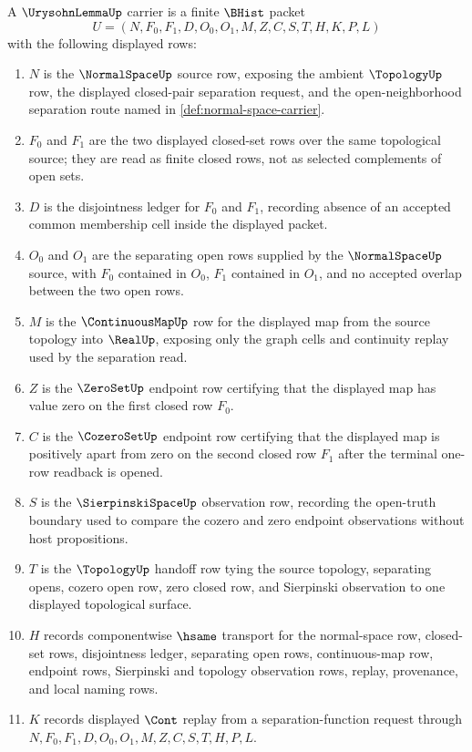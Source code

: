 \begin{definition}
\label{def:normal-space-urysohn-separation-carrier}
A $\UrysohnLemmaUp$ carrier is a finite $\BHist$ packet
$$
U=(N,F_0,F_1,D,O_0,O_1,M,Z,C,S,T,H,K,P,L)
$$
with the following displayed rows:
\begin{enumerate}
\item $N$ is the $\NormalSpaceUp$ source row, exposing the ambient $\TopologyUp$ row, the displayed closed-pair separation request, and the open-neighborhood separation route named in \autoref{def:normal-space-carrier}.
\item $F_0$ and $F_1$ are the two displayed closed-set rows over the same topological source; they are read as finite closed rows, not as selected complements of open sets.
\item $D$ is the disjointness ledger for $F_0$ and $F_1$, recording absence of an accepted common membership cell inside the displayed packet.
\item $O_0$ and $O_1$ are the separating open rows supplied by the $\NormalSpaceUp$ source, with $F_0$ contained in $O_0$, $F_1$ contained in $O_1$, and no accepted overlap between the two open rows.
\item $M$ is the $\ContinuousMapUp$ row for the displayed map from the source topology into $\RealUp$, exposing only the graph cells and continuity replay used by the separation read.
\item $Z$ is the $\ZeroSetUp$ endpoint row certifying that the displayed map has value zero on the first closed row $F_0$.
\item $C$ is the $\CozeroSetUp$ endpoint row certifying that the displayed map is positively apart from zero on the second closed row $F_1$ after the terminal one-row readback is opened.
\item $S$ is the $\SierpinskiSpaceUp$ observation row, recording the open-truth boundary used to compare the cozero and zero endpoint observations without host propositions.
\item $T$ is the $\TopologyUp$ handoff row tying the source topology, separating opens, cozero open row, zero closed row, and Sierpinski observation to one displayed topological surface.
\item $H$ records componentwise $\hsame$ transport for the normal-space row, closed-set rows, disjointness ledger, separating open rows, continuous-map row, endpoint rows, Sierpinski and topology observation rows, replay, provenance, and local naming rows.
\item $K$ records displayed $\Cont$ replay from a separation-function request through $N,F_0,F_1,D,O_0,O_1,M,Z,C,S,T,H,P,L$.

\end{enumerate}
\end{definition}
